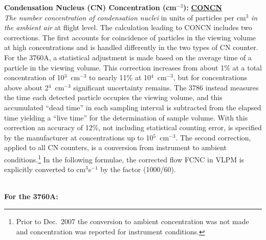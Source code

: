 \begin{hangparagraphs}
\textbf{Condensation Nucleus (CN) Concentration (cm$^{-3}$):}\textbf{
}\textbf{\uline{CONCN}}\\
\emph{The number concentration of condensation nuclei} in units of
particles per cm$^{3}$ \emph{in the ambient air} at flight level.\emph{
}The calculation leading to CONCN includes
two corrections. The first accounts
for coincidence of particles in the viewing volume at high concentrations
and is handled differently in the two types of CN counter. For the
3760A, a statistical adjustment is made based on the average time
of a particle in the viewing volume. This correction increases from
about 1\% at a total concentration of 10$^{3}$~cm$^{-3}$ to nearly
11\% at 10$^{4}$~cm$^{-3}$, but for concentrations above about
2$^{4}$~cm$^{-3}$ significant uncertainty remains.
The 3786 instead measures the time each detected particle occupies
the viewing volume, and this\emph{ }accumulated \textquotedblleft dead
time\textquotedblright {} in each sampling
interval is subtracted from the elapsed time yielding a \textquotedblleft live
time\textquotedblright{} for the determination of sample volume. With
this correction an accuracy of 12\%, not including statistical counting
error, is specified by the manufacturer at concentrations up to 10$^{5}$~cm$^{-3}$.
The second correction, applied to all CN counters, is a conversion
from instrument to ambient conditions.\footnote{Prior to Dec.~2007 the conversion to ambient concentration was not
made and concentration was reported for instrument conditions.} In the following formulae, the corrected flow FCNC in VLPM is explicitly
converted to cm$^{3}$s$^{-1}$ by the factor (1000/60).\emph{}\\
\emph{}\\
\noindent\begin{minipage}[t]{1\columnwidth}%
\textbf{For the 3760A:}\\
\end{minipage}
\end{hangparagraphs}
